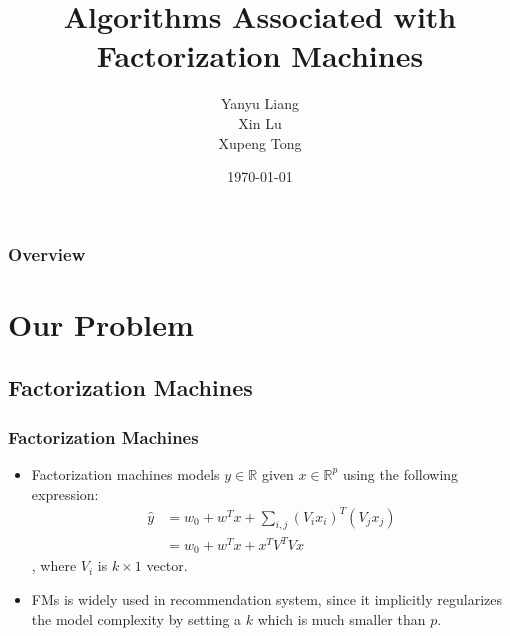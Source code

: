 \documentclass{beamer}
\title[Algos for FMs]{Algorithms Associated with Factorization Machines} %
\author{Yanyu Liang \\
Xin Lu \\
Xupeng Tong} %
\institute[CMU] %
{
Carnegie Mellon University \\ %
\medskip
\textit{\{yanyul,xlu2,xtong\}@andrew.cmu.edu} %
}
\date{\today} %
\begin{document}
\begin{frame}
\titlepage %
\end{frame}
\begin{frame}
\frametitle{Overview} %
\tableofcontents %
\end{frame}


\section{Our Problem} %
  \subsection{Factorization Machines}
  \begin{frame}
  \frametitle{Factorization Machines}
    \begin{itemize}
      \item Factorization machines \cite{rendle2010factorization} models $y \in \mathbb{R}$ given $x \in \mathbb{R}^p$ using the following expression:
      \begin{align*}
        \hat{y} &= w_0 + w^T x + \sum_{i, j} (V_ix_i)^T(V_jx_j) \\
        &= w_0 + w^T x + x^T V^T V x
      \end{align*}
      , where $V_i$ is $k \times 1$ vector. 
      \item FMs is widely used in recommendation system, since it implicitly regularizes the model complexity by setting a $k$ which is much smaller than $p$.
    \end{itemize}
  \end{frame}
\end{document}
